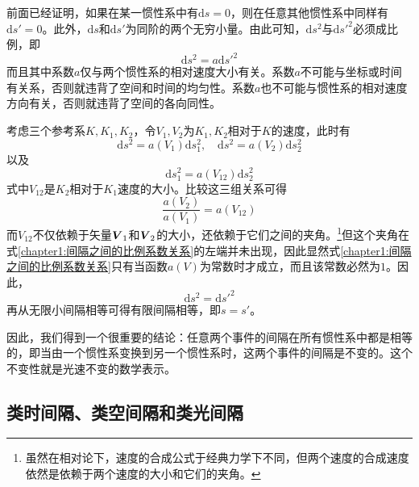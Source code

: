 前面已经证明，如果在某一惯性系中有$\mathrm{d}s=0$，则在任意其他惯性系中同样有$\mathrm{d}s'=0$。此外，$\mathrm{d}s$和$\mathrm{d}s'$为同阶的两个无穷小量。由此可知，$\mathrm{d}s^2$与$\mathrm{d}s'^2$必须成比例，即
\begin{equation}
	\mathrm{d}s^2 = a\mathrm{d}s'^2
\end{equation}
而且其中系数$a$仅与两个惯性系的相对速度大小有关。系数$a$不可能与坐标或时间有关系，否则就违背了空间和时间的均匀性。系数$a$也不可能与惯性系的相对速度方向有关，否则就违背了空间的各向同性。

考虑三个参考系$K,K_1,K_2$，令$V_1,V_2$为$K_1,K_2$相对于$K$的速度，此时有
\begin{equation*}
	\mathrm{d}s^2 = a(V_1) \mathrm{d}s_1^2 ,\quad \mathrm{d}s^2 = a(V_2) \mathrm{d}s_2^2 
\end{equation*}
以及
\begin{equation*}
	\mathrm{d}s_1^2 = a(V_{12}) \mathrm{d}s_2^2
\end{equation*}
式中$V_{12}$是$K_2$相对于$K_1$速度的大小。比较这三组关系可得
\begin{equation}
	\frac{a(V_2)}{a(V_1)} = a(V_{12})
	\label{chapter1:间隔之间的比例系数关系}
\end{equation}
而$V_{12}$不仅依赖于矢量$\boldsymbol{V}_1$和$\boldsymbol{V}_2$的大小，还依赖于它们之间的夹角。\footnote{虽然在相对论下，速度的合成公式于经典力学下不同，但两个速度的合成速度依然是依赖于两个速度的大小和它们的夹角。}但这个夹角在式\eqref{chapter1:间隔之间的比例系数关系}的左端并未出现，因此显然式\eqref{chapter1:间隔之间的比例系数关系}只有当函数$a(V)$为常数时才成立，而且该常数必然为$1$。因此，
\begin{equation}
	\mathrm{d} s^2 = \mathrm{d} s'^2
	\label{chapter1:无限小间隔相等}
\end{equation}
再从无限小间隔相等可得有限间隔相等，即$s=s'$。

因此，我们得到一个很重要的结论：任意两个事件的间隔在所有惯性系中都是相等的，即当由一个惯性系变换到另一个惯性系时，这两个事件的间隔是不变的。这个不变性就是光速不变的数学表示。

\subsection{类时间隔、类空间隔和类光间隔}

